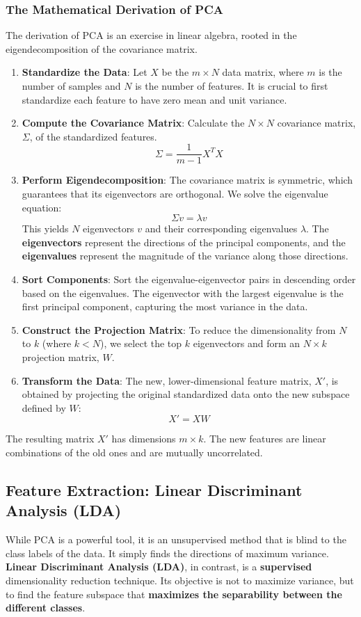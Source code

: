 \subsubsection*{The Mathematical Derivation of PCA}
The derivation of PCA is an exercise in linear algebra, rooted in the eigendecomposition of the covariance matrix.
\begin{enumerate}
    \item \textbf{Standardize the Data}: Let $X$ be the $m \times N$ data matrix, where $m$ is the number of samples and $N$ is the number of features. It is crucial to first standardize each feature to have zero mean and unit variance.
    \item \textbf{Compute the Covariance Matrix}: Calculate the $N \times N$ covariance matrix, $\Sigma$, of the standardized features.
    $$ \Sigma = \frac{1}{m-1} X^T X $$
    \item \textbf{Perform Eigendecomposition}: The covariance matrix is symmetric, which guarantees that its eigenvectors are orthogonal. We solve the eigenvalue equation:
    $$ \Sigma v = \lambda v $$
    This yields $N$ eigenvectors $v$ and their corresponding eigenvalues $\lambda$. The \textbf{eigenvectors} represent the directions of the principal components, and the \textbf{eigenvalues} represent the magnitude of the variance along those directions.
    \item \textbf{Sort Components}: Sort the eigenvalue-eigenvector pairs in descending order based on the eigenvalues. The eigenvector with the largest eigenvalue is the first principal component, capturing the most variance in the data.
    \item \textbf{Construct the Projection Matrix}: To reduce the dimensionality from $N$ to $k$ (where $k < N$), we select the top $k$ eigenvectors and form an $N \times k$ projection matrix, $W$.
    \item \textbf{Transform the Data}: The new, lower-dimensional feature matrix, $X'$, is obtained by projecting the original standardized data onto the new subspace defined by $W$:
    $$ X' = XW $$
\end{enumerate}
The resulting matrix $X'$ has dimensions $m \times k$. The new features are linear combinations of the old ones and are mutually uncorrelated.

\subsection*{Feature Extraction: Linear Discriminant Analysis (LDA)}
While PCA is a powerful tool, it is an unsupervised method that is blind to the class labels of the data. It simply finds the directions of maximum variance. \textbf{Linear Discriminant Analysis (LDA)}, in contrast, is a \textbf{supervised} dimensionality reduction technique. Its objective is not to maximize variance, but to find the feature subspace that \textbf{maximizes the separability between the different classes}.

